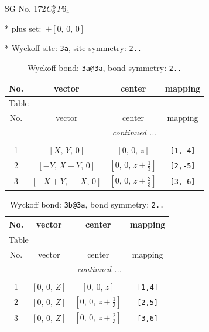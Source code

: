 \documentclass[fleqn,8pt]{jsarticle}
\begin{document}
\setcounter{MaxMatrixCols}{32}

\renewcommand{\tablename}{Table~}
\renewcommand{\figurename}{Figure~}
\begin{center}
\LARGE
SG No. 172\quad$C_{\rm 6}^{5}$\quad$P6_4$\quad[ hexagonal ]
\end{center}

* plus set:\,\,\,$+\left[ 0,\, 0,\, 0 \right]$


* Wyckoff site: {\tt 3a}, site symmetry: {\tt 2..}
\renewcommand{\arraystretch}{1.2}
\begin{longtable}{cccc}
\caption{Wyckoff bond: {\tt 3a@3a}, bond symmetry: {\tt 2..}}
 \\
 \hline \hline
No. & vector & center & mapping \\ \hline \endfirsthead

\multicolumn{3}{l}{\tablename\ \thetable{}} \\
 \hline \hline
No. & vector & center & mapping \\ \hline \endhead

 \hline \hline
\multicolumn{3}{r}{\footnotesize\it continued ...} \\ \endfoot

 \hline \hline
\multicolumn{3}{r}{} \\ \endlastfoot

1 & $\left[ X,\, Y,\, 0 \right]$ & $\left[ 0,\, 0,\, z \right]$ & {\tt [1,-4]} \\ \hline
2 & $\left[ - Y,\, X - Y,\, 0 \right]$ & $\left[ 0,\, 0,\, z + \frac{1}{3} \right]$ & {\tt [2,-5]} \\ \hline
3 & $\left[ - X + Y,\, - X,\, 0 \right]$ & $\left[ 0,\, 0,\, z + \frac{2}{3} \right]$ & {\tt [3,-6]} \\
\end{longtable}
\renewcommand{\arraystretch}{1.2}
\begin{longtable}{cccc}
\caption{Wyckoff bond: {\tt 3b@3a}, bond symmetry: {\tt 2..}}
 \\
 \hline \hline
No. & vector & center & mapping \\ \hline \endfirsthead

\multicolumn{3}{l}{\tablename\ \thetable{}} \\
 \hline \hline
No. & vector & center & mapping \\ \hline \endhead

 \hline \hline
\multicolumn{3}{r}{\footnotesize\it continued ...} \\ \endfoot

 \hline \hline
\multicolumn{3}{r}{} \\ \endlastfoot

1 & $\left[ 0,\, 0,\, Z \right]$ & $\left[ 0,\, 0,\, z \right]$ & {\tt [1,4]} \\ \hline
2 & $\left[ 0,\, 0,\, Z \right]$ & $\left[ 0,\, 0,\, z + \frac{1}{3} \right]$ & {\tt [2,5]} \\ \hline
3 & $\left[ 0,\, 0,\, Z \right]$ & $\left[ 0,\, 0,\, z + \frac{2}{3} \right]$ & {\tt [3,6]} \\
\end{longtable}
\end{document}
